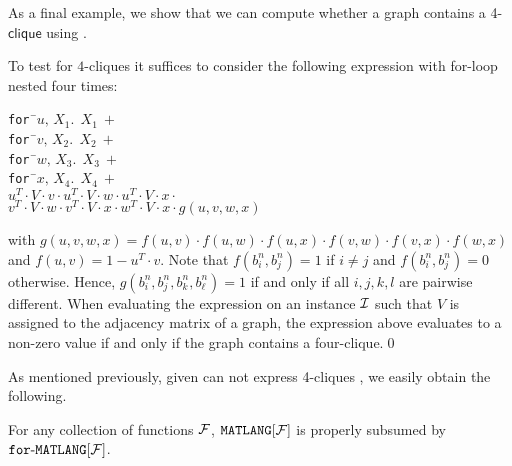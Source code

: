 As a final example, we show that we can compute whether a graph contains a 4-$\textsf{clique}$ using \langfor.
\begin{example}\label{ex:fourcliques}
To test for $4$-cliques it suffices to consider the following expression with for-loop nested four times:
\begin{tabbing}
\texttt{for\,}\=$u,\,X_1.\ \ X_1 \ + $\\
\> \texttt{for\,}\=$v,\,X_2.\ \ X_2 \ +$ \\
\>\>\texttt{for\,}\=$w,\,X_3.\ \ X_3 \ +$ \\
\>\>\>\texttt{for\,}\=$x,\,X_4.\ \ X_4 \ +$ \\
\>\>\>\>$u^T\cdot V\cdot v \cdot u^T\cdot V\cdot w\cdot u^T\cdot V\cdot x \cdot $\\
\>\>\>\>$v^T\cdot V\cdot w \cdot v^T\cdot V\cdot x\cdot w^T\cdot V\cdot x \cdot g(u,v,w,x)$
\end{tabbing}
with $g(u,v,w,x)=f(u,v)\cdot f(u,w)\cdot f(u,x)\cdot f(v,w)\cdot f(v,x)\cdot f(w,x)$ and
$f(u,v)=1-u^T\cdot v$. Note that $f(b_i^n,b_j^n)=1$ if $i\neq j$ and $f(b_i^n,b_j^n)=0$ otherwise.
Hence, $g(b_i^n,b_j^n,b_k^n,b_\ell^n)=1$ if and only if all $i,j,k,l$ are pairwise different.
When evaluating the expression on an instance $\mathcal{I}$ such that $V$ is assigned to the adjacency 
matrix of a graph, the expression above evaluates to a non-zero value if and only if the graph
contains a four-clique.\qed
\end{example}
%
%

As mentioned previously, given \lang can not express 4-cliques \cite{BrijderGBW19}, we easily obtain the following.

\begin{proposition}
\label{cor-ml-fml}
For any collection of functions $\mathcal{F}$, 
$\texttt{MATLANG}[\mathcal{F}]$ is properly subsumed by $\texttt{for}\text{-}\texttt{MATLANG}[\mathcal{F}]$.
\end{proposition} 







